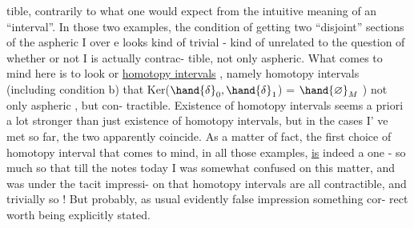 tible,  contrarily to what one would expect from the intuitive meaning of
an ``interval''.  In those two examples,  the condition of getting two
``disjoint'' sections of the aspheric I over e  looks kind of trivial - 
kind of unrelated to the question of whether or not I is actually contrac-%
tible,  not only aspheric.  What comes to mind here is to look or  
\uline{homotopy intervals} ,  namely homotopy intervals  (including condition b)
that Ker($\hand{\ensuremath{\delta}}_0,\hand{\ensuremath{\delta}}_1$) = $\hand{\varnothing}_M$ )    not only aspheric , but    con-%
tractible.  Existence of   homotopy intervals seems a priori a lot
stronger than just existence of homotopy intervals,  but in the cases I'%
ve met so far,  the two apparently coincide.  As a matter of fact,  the
 first choice of homotopy interval that comes to mind,  in all those
examples,  \uline{is} indeed a   one  -  so much so that till the notes today
I was somewhat confused on this matter,  and was under the tacit impressi-%
on that homotopy intervals are all contractible,  and trivially so ! But
probably,  as usual   evidently false impression  something cor-%
rect   worth  being explicitly stated.

